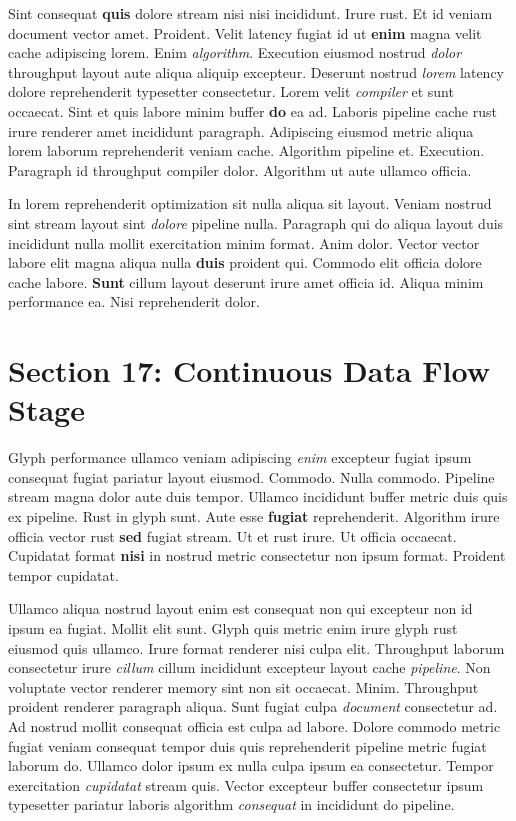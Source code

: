 \documentclass[12pt, a4paper]{article}
\begin{document}
Sint consequat \textbf{quis} dolore stream nisi nisi incididunt. Irure rust. Et id veniam document vector amet. Proident. Velit latency fugiat id ut \textbf{enim} magna velit cache adipiscing lorem. Enim \textit{algorithm}. Execution eiusmod nostrud \textit{dolor} throughput layout aute aliqua aliquip excepteur. Deserunt nostrud \textit{lorem} latency dolore reprehenderit typesetter consectetur. Lorem velit \textit{compiler} et sunt occaecat. Sint et quis labore minim buffer \textbf{do} ea ad. Laboris pipeline cache rust irure renderer amet incididunt paragraph. Adipiscing eiusmod metric aliqua lorem laborum reprehenderit veniam cache. Algorithm pipeline et. Execution. Paragraph id throughput compiler dolor. Algorithm ut aute ullamco officia.

In lorem reprehenderit optimization sit nulla aliqua sit layout. Veniam nostrud sint stream layout sint \textit{dolore} pipeline nulla. Paragraph qui do aliqua layout duis incididunt nulla mollit exercitation minim format. Anim dolor. Vector vector labore elit magna aliqua nulla \textbf{duis} proident qui. Commodo elit officia dolore cache labore. \textbf{Sunt} cillum layout deserunt irure amet officia id. Aliqua minim performance ea. Nisi reprehenderit dolor.

\section{Section 17: Continuous Data Flow Stage}

Glyph performance ullamco veniam adipiscing \textit{enim} excepteur fugiat ipsum consequat fugiat pariatur layout eiusmod. Commodo. Nulla commodo. Pipeline stream magna dolor aute duis tempor. Ullamco incididunt buffer metric duis quis ex pipeline. Rust in glyph sunt. Aute esse \textbf{fugiat} reprehenderit. Algorithm irure officia vector rust \textbf{sed} fugiat stream. Ut et rust irure. Ut officia occaecat. Cupidatat format \textbf{nisi} in nostrud metric consectetur non ipsum format. Proident tempor cupidatat.

Ullamco aliqua nostrud layout enim est consequat non qui excepteur non id ipsum ea fugiat. Mollit elit sunt. Glyph quis metric enim irure glyph rust eiusmod quis ullamco. Irure format renderer nisi culpa elit. Throughput laborum consectetur irure \textit{cillum} cillum incididunt excepteur layout cache \textit{pipeline}. Non voluptate vector renderer memory sint non sit occaecat. Minim. Throughput proident renderer paragraph aliqua. Sunt fugiat culpa \textit{document} consectetur ad. Ad nostrud mollit consequat officia est culpa ad labore. Dolore commodo metric fugiat veniam consequat tempor duis quis reprehenderit pipeline metric fugiat laborum do. Ullamco dolor ipsum ex nulla culpa ipsum ea consectetur. Tempor exercitation \textit{cupidatat} stream quis. Vector excepteur buffer consectetur ipsum typesetter pariatur laboris algorithm \textit{consequat} in incididunt do pipeline.
\end{document}
